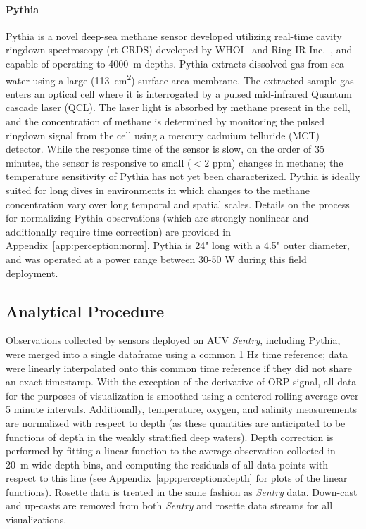 \paragraph{Pythia}
\label{sec:nopp}
Pythia is a novel deep-sea methane sensor developed utilizing real-time cavity ringdown spectroscopy (rt-CRDS) developed by WHOI~\autocite{michel2022gas} and Ring-IR Inc.~\autocite{Harb:12}, and capable of operating to \SI{4000}{\meter} depths. Pythia extracts dissolved gas from sea water using a large (\SI{113}{\centi\meter\squared}) surface area membrane. The extracted sample gas enters an optical cell where it is interrogated by a pulsed mid-infrared Quantum cascade laser (QCL). The laser light is absorbed by methane present in the cell, and the concentration of methane is determined by monitoring the pulsed ringdown signal from the cell using a mercury cadmium telluride (MCT) detector. While the response time of the sensor is slow, on the order of 35 minutes, the sensor is responsive to small ($<$2 ppm) changes in methane; the temperature sensitivity of Pythia has not yet been characterized. Pythia is ideally suited for long dives in environments in which changes to the methane concentration vary over long temporal and spatial scales. Details on the process for normalizing Pythia observations (which are strongly nonlinear and additionally require time correction) are provided in Appendix~\ref{app:perception:norm}. Pythia is 24" long with a 4.5" outer diameter, and was operated at a power range between 30-50 W during this field deployment.

\subsection{Analytical Procedure}
\label{sec:analytical}
Observations collected by sensors deployed on AUV \emph{Sentry}, including Pythia, were merged into a single dataframe using a common 1 Hz time reference; data were linearly interpolated onto this common time reference if they did not share an exact timestamp. With the exception of the derivative of ORP signal, all data for the purposes of visualization is smoothed using a centered rolling average over 5 minute intervals. Additionally, temperature, oxygen, and salinity measurements are normalized with respect to depth (as these quantities are anticipated to be functions of depth in the weakly stratified deep waters). Depth correction is performed by fitting a linear function to the average observation collected in \SI{20}{\meter} wide depth-bins, and computing the residuals of all data points with respect to this line (see Appendix~\ref{app:perception:depth} for plots of the linear functions). Rosette data is treated in the same fashion as \emph{Sentry} data. Down-cast and up-casts are removed from both \emph{Sentry} and rosette data streams for all visualizations.

